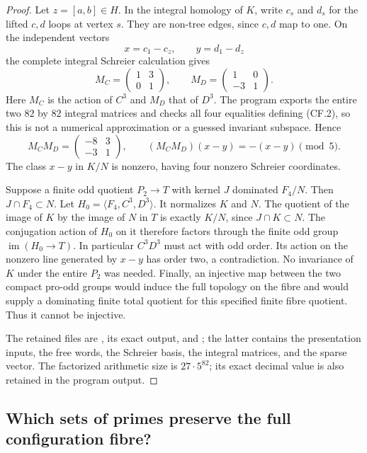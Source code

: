 \documentclass[11pt,a4paper]{article}
\newcommand{\im}{\operatorname{im}}
\begin{document}
\begin{proof}
Let $z=[a,b]\in H$. In the integral homology of $K$, write $c_s$
and $d_s$ for the lifted $c,d$ loops at vertex $s$. They are non-tree
edges, since $c,d$ map to one. On the independent vectors
\[
                 x=c_1-c_z,\qquad y=d_1-d_z
\]
the complete integral Schreier calculation gives
\[
 M_C=\begin{pmatrix}1&3\\0&1\end{pmatrix},\qquad
 M_D=\begin{pmatrix}1&0\\-3&1\end{pmatrix}.                    \tag{CF.2}
\]
Here $M_C$ is the action of $C^3$ and $M_D$ that of $D^3$.
The program exports the entire two $82$ by $82$ integral matrices
and checks all four equalities defining (CF.2), so this is not a
numerical approximation or a guessed invariant subspace. Hence
\[
 M_CM_D=\begin{pmatrix}-8&3\\-3&1\end{pmatrix},\qquad
 (M_CM_D)(x-y)=-(x-y)\pmod5.
\]
The class $x-y$ in $K/N$ is nonzero, having four nonzero Schreier
coordinates.

Suppose a finite odd quotient $P_2\to T$ with kernel $J$ dominated
$F_4/N$. Then $J\cap F_4\subset N$. Let
$H_0=\langle F_4,C^3,D^3\rangle$. It normalizes $K$ and $N$.
The quotient of the image of $K$ by the image of $N$ in $T$ is
exactly $K/N$, since $J\cap K\subset N$. The conjugation action of
$H_0$ on it therefore factors through the finite odd group
$\im(H_0\to T)$. In particular $C^3D^3$ must act with odd order.
Its action on the nonzero line generated by $x-y$ has order two,
a contradiction. No invariance of $K$ under the entire $P_2$ was
needed. Finally, an injective map between the two compact pro-odd
groups would induce the full topology on the fibre and would supply
a dominating finite total quotient for this specified finite fibre
quotient. Thus it cannot be injective.

The retained files are
, its exact output, and
; the latter
contains the presentation inputs, the free words, the Schreier basis,
the integral matrices, and the sparse vector. The factorized arithmetic size is $27\cdot5^{82}$; its exact decimal
value is also retained in the program output.
\end{proof}

\subsection{Which sets of primes preserve the full configuration fibre?}
\end{document}
